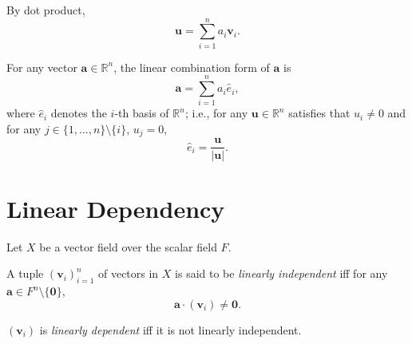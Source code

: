 \begin{note}
	By dot product,
	$$
	\mathbf u = \sum_{i = 1}^n a_i \mathbf v_i.
	$$
\end{note}


\begin{note}
	For any vector $\mathbf a \in \mathbb R^n$, the linear combination form of $\mathbf a$ is
	$$
	\mathbf a = \sum_{i = 1}^n a_i \hat e_i,
	$$
	where $\hat e_i$ denotes the $i$-th basis of $\mathbb R^n$; i.e., for any $\mathbf u \in \mathbb R^n$ satisfies that $u_i \ne 0$ and for any $j \in \{1, \ldots, n\} \setminus \{i\}$, $u_j = 0$,
	$$
	\hat e_i = \frac{\mathbf u}{|\mathbf u|}.
	$$
\end{note}





\section{Linear Dependency}



\begin{definition}
	\label{def: linear dependency}
	Let $X$ be a vector field over the scalar field $F$.
	
	A tuple $(\mathbf v_i)_{i = 1}^n$ of vectors in $X$ is said to be \textit{linearly independent} iff for any $\mathbf a \in F^n \setminus \{\mathbf 0\}$,
	$$
	\mathbf a \cdot (\mathbf v_i) \ne \mathbf 0.
	$$
	
	$(\mathbf v_i)$ is \textit{linearly dependent} iff it is not linearly independent.
\end{definition}













































%